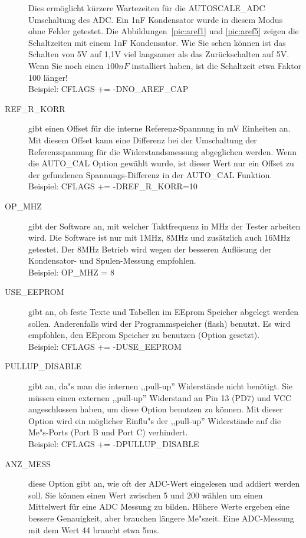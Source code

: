 \begin{description}
Dies erm\"oglicht k\"urzere Wartezeiten f\"ur die AUTOSCALE\_ADC Umschaltung des ADC.
Ein 1nF Kondensator wurde in diesem Modus ohne Fehler getestet.
Die Abbildungen~\ref{pic:aref1} und \ref{pic:aref5} zeigen die Schaltzeiten mit einem 1nF Kondensator.
Wie Sie sehen k\"onnen ist das Schalten von 5V auf 1,1V viel langsamer als das Zur\"uckschalten auf 5V.
Wenn Sie noch einen \(100 nF\) installiert haben, ist die Schaltzeit etwa Faktor 100 l\"anger!\\
Beispiel: CFLAGS += -DNO\_AREF\_CAP
  \item[REF\_R\_KORR] gibt einen Offset f\"ur die interne Referenz-Spannung in mV Einheiten an.
Mit diesem Offset kann eine Differenz bei der Umschaltung der Referenzspannung f\"ur die Widerstandsmessung abgeglichen werden.
Wenn die AUTO\_CAL Option gew\"ahlt wurde, ist dieser Wert nur ein Offset zu der gefundenen Spannungs-Differenz in der
AUTO\_CAL Funktion.\\
Beispiel:  CFLAGS += -DREF\_R\_KORR=10
  \item[OP\_MHZ] gibt der Software an, mit welcher Taktfrequenz in MHz der Tester arbeiten wird.
Die Software ist nur mit 1MHz, 8MHz und zus\"atzlich auch 16MHz getestet. Der 8MHz Betrieb wird wegen der besseren Aufl\"osung der
Kondensator- und Spulen-Messung empfohlen.\\
Beispiel: OP\_MHZ = 8
  \item[USE\_EEPROM] gibt an, ob feste Texte und Tabellen im EEprom Speicher abgelegt werden sollen.
Anderenfalls wird der Programmspeicher (flash) benutzt.
Es wird empfohlen, den EEprom Speicher zu benutzen (Option gesetzt).\\
Beispiel: CFLAGS += -DUSE\_EEPROM
  \item[PULLUP\_DISABLE] gibt an, da"s man die internen ,,pull-up'' Widerst\"ande nicht ben\"otigt.
 Sie m\"ussen einen externen ,,pull-up'' Widerstand an Pin 13 (PD7) und VCC angeschlossen haben, um diese
Option benutzen zu k\"onnen.
Mit dieser Option wird ein m\"oglicher Einflu"s der ,,pull-up'' Widerst\"ande auf die Me"s-Ports (Port B und Port C) verhindert.\\
Beispiel: CFLAGS += -DPULLUP\_DISABLE
  \item[ANZ\_MESS] diese Option gibt an, wie oft der ADC-Wert eingelesen und addiert werden soll.
Sie k\"onnen einen Wert zwischen 5 und 200 w\"ahlen um einen Mittelwert f\"ur eine ADC Messung zu bilden.
H\"ohere Werte ergeben eine bessere Genauigkeit, aber brauchen l\"angere Me"szeit.
Eine ADC-Messung mit dem Wert 44 braucht etwa 5ms.\\

\end{description}
